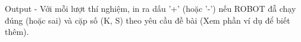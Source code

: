 Output
- Với mỗi lượt thí nghiệm, in ra dấu '+' (hoặc '-') nếu ROBOT đẵ chạy đúng (hoặc sai) và cặp số (K, S) theo yêu cầu đề bài (Xem phần ví dụ để biết thêm).